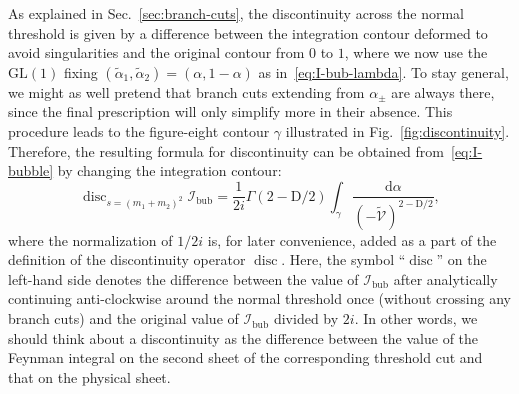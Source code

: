 \documentclass[12pt]{article}
\numberwithin{figure}{section}
\DeclareMathOperator{\disc}{disc}
\def \be {\begin{equation}}
\def \ee {\end{equation}}
\def \D {\mathrm{D}}
\def \d {\mathrm{d}}
\def \V {\mathcal{V}}
\def \I {\mathcal{I}}
\def \GL {\mathrm{GL}}
\def \bubble {\mathrm{bub}}
\begin{document}
	As explained in Sec.~\ref{sec:branch-cuts}, the discontinuity across the normal threshold is given by a difference between the  integration contour deformed to avoid singularities and the original contour from $0$ to $1$, where we now use the $\GL (1)$ fixing $(\tilde{\alpha}_1,\tilde{\alpha}_2)=(\alpha,1-\alpha)$ as in~\eqref{eq:I-bub-lambda}. To stay general, we might as well pretend that branch cuts extending from $\alpha_\pm$ are always there, since the final prescription will only simplify more in their absence. This procedure leads to the figure-eight contour $\gamma$ illustrated in Fig.~\ref{fig:discontinuity}. Therefore, the resulting formula for discontinuity can be obtained from~\eqref{eq:I-bubble} by changing the integration contour:
	\be
	\disc_{s=(m_1 + m_2)^2} \I_{\bubble} = \frac{1}{2 i} \Gamma(2{-}\D/2) \int_{\gamma} \frac{\d\alpha}{(-\tilde{\V})^{2-\D/2}},
	\ee
	where the normalization of $1/2i$ is, for later convenience, added as a part of the definition of the discontinuity operator $\disc$. 
	Here, the symbol ``$\disc$'' on the left-hand side denotes the difference between the value of $\I_{\bubble}$ after analytically continuing anti-clockwise around the normal threshold once (without crossing any branch cuts) and the original value of $\I_{\bubble}$ divided by $2i$. In other words, we should think about a discontinuity as the difference between the value of the Feynman integral on the second sheet of the corresponding threshold cut and that on the physical sheet.
	
\end{document}
